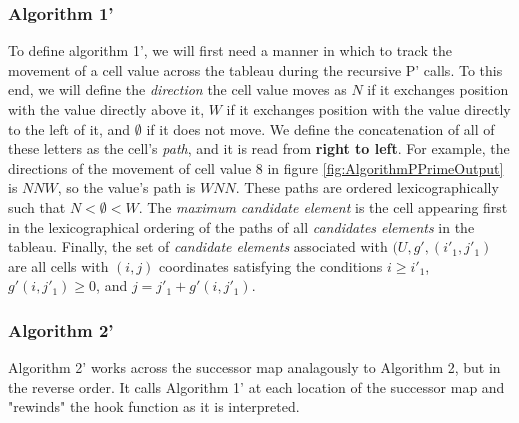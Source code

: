 \documentclass[11pt]{article}
\theoremstyle{definition}
\begin{document}
\subsubsection{Algorithm 1'}
To define algorithm 1', we will first need a manner in which to track the movement of a cell value across the tableau during the recursive P' calls. To this end, we will define the \emph{direction} the cell value moves as $N$ if it exchanges position with the value directly above it, $W$ if it exchanges position with the value directly to the left of it, and $\emptyset$ if it does not move. We define the concatenation of all of these letters as the cell's \emph{path}, and it is read from \textbf{right to left}.  
For example, the directions of the movement of cell value 8 in figure \ref{fig:AlgorithmPPrimeOutput} is $N N W$, so the value's path is $W N N$. These paths are ordered lexicographically such that $N < \emptyset < W$. The \emph{maximum candidate element} is the cell appearing first in the lexicographical ordering of the paths of all \emph{candidates elements} in the tableau. 
Finally, the set of \emph{candidate elements} associated with $(U,g',(i'_1,j'_1)$ are all cells with $(i,j)$ coordinates satisfying the conditions $i \geq i'_1$, $g'(i,j'_1) \ge 0$, and $j = j'_1 + g'(i,j'_1)$.
\begin{algorithm}[H]
\end{algorithm}
\subsubsection{Algorithm 2'}
Algorithm 2' works across the successor map analagously to Algorithm 2, but in the reverse order. It calls Algorithm 1' at each location of the successor map and "rewinds" the hook function as it is interpreted. 

\begin{algorithm}[H]
\end{algorithm}
\end{document}
